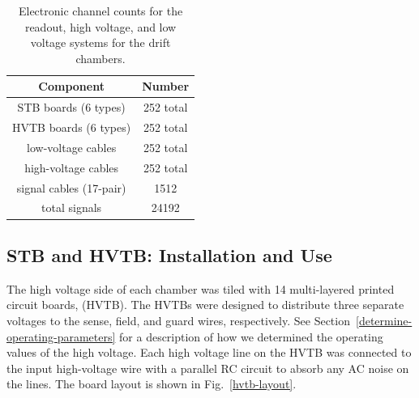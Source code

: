 \begin{table}[htbp]
\begin{center}
\begin{tabular} {||c|c||} \hline \hline
{\bf Component}           & {\bf Number} \\ \hline
STB boards (6 types)      & 252 total \\ \hline
HVTB boards (6 types)     & 252 total \\ \hline
low-voltage cables        & 252 total  \\ \hline
high-voltage cables       & 252 total  \\ \hline
signal cables (17-pair)   & 1512 \\ \hline
total signals             & 24192 \\ \hline \hline
\end{tabular}
\caption{\small{Electronic channel counts for the readout, high voltage,
and low voltage systems for the drift chambers.}}
\label{electronic-components}
\end{center}
\end{table}

\subsection{STB and HVTB: Installation and Use}

The high voltage side of each chamber was tiled with 14  multi-layered printed circuit 
boards, (HVTB). The HVTBs were designed to distribute three
separate voltages to the sense, field, and guard wires, respectively.  See
Section~\ref{determine-operating-parameters} for a 
description of how we determined the operating values of the high voltage.  
Each high voltage line on the HVTB was connected to the 
input high-voltage wire with a parallel RC circuit to absorb any AC noise on
the lines.  The board layout is shown in Fig.~\ref{hvtb-layout}.

